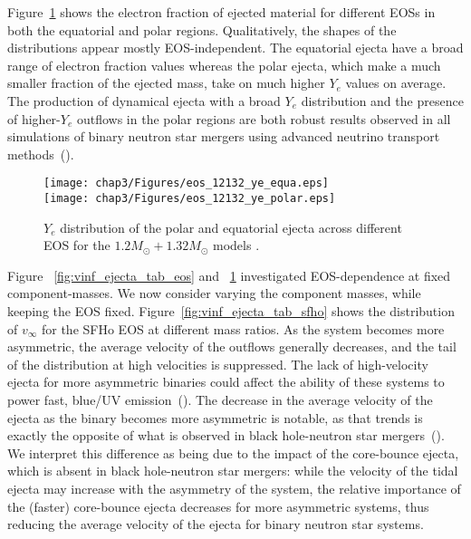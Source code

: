   Figure~\ref{fig:ye_ejecta_tab_eos} shows the electron fraction of ejected material for different EOSs in both the equatorial and polar regions. Qualitatively, the shapes of the distributions appear mostly EOS-independent.
  The equatorial ejecta have a broad range of electron fraction values whereas the polar ejecta, which make a much smaller fraction of the ejected mass, take on much higher $Y_e$ values on average. The production of dynamical ejecta with a broad $Y_e$ distribution and the presence of higher-$Y_e$ outflows in the polar regions are both robust results observed in all simulations of binary neutron star mergers using advanced neutrino transport methods~(\citet*{wanajo2014,sekiguchi2016dynamical,foucart:2015gaa,foucart2016impact}).
  
  \begin{figure}[!htbp]
    \centering
  \texttt{[image: chap3/Figures/eos\_12132\_ye\_equa.eps]}\\
  \texttt{[image: chap3/Figures/eos\_12132\_ye\_polar.eps]}
\caption{
   $Y_e$ distribution of the polar and equatorial ejecta across different EOS for the $1.2M_\odot + 1.32M_\odot$ models .
}
\label{fig:ye_ejecta_tab_eos}
\end{figure}

Figure ~\ref{fig:vinf_ejecta_tab_eos} and ~\ref{fig:ye_ejecta_tab_eos} investigated EOS-dependence at fixed component-masses. We now consider varying the component masses, while keeping the EOS fixed. Figure~\ref{fig:vinf_ejecta_tab_sfho} shows the distribution of $v_\infty$ 
for the SFHo EOS at different mass ratios.
As the system becomes more asymmetric, the average velocity of the outflows generally decreases, and the tail of the distribution at high velocities is suppressed. The lack of high-velocity ejecta for more asymmetric binaries could affect the ability of these systems to power fast, blue/UV emission~(\citet*{metzger2017}). The decrease in the average velocity of the ejecta as the binary becomes more asymmetric is notable, as that trends is exactly the opposite of what is observed in black hole-neutron star mergers~(\citet*{kawaguchi2016models,foucart2016dynamical}). We interpret this difference as being due to the impact of the core-bounce ejecta, which is absent in black hole-neutron star mergers: while the velocity of the tidal ejecta may increase with the asymmetry of the system, the relative importance of the (faster) core-bounce ejecta decreases for more asymmetric systems, thus reducing the average velocity of the ejecta for binary neutron star systems.


